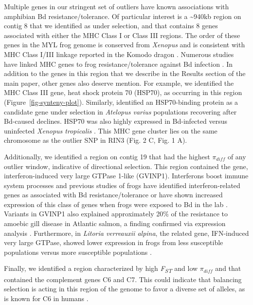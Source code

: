 \documentclass[9pt,twoside,lineno]{pnas-new}
\begin{document}
Multiple genes in our stringent set of outliers have known associations
with amphibian Bd resistance/tolerance. Of particular interest is a
\textasciitilde940kb region on contig 8 that we identified as under
selection, and that contains 8 genes associated with either the MHC
Class I or Class III regions. The order of these genes in the MYL frog
genome is conserved from \emph{Xenopus} \citep{ohta2006} and is
consistent with MHC Class I/III linkage reported in the Komodo dragon
\citep{reed2021}. Numerous studies have linked MHC genes to frog
resistance/tolerance against Bd infection
\citep[e.g.,][]{savage2011, bataille2015}. In addition to the genes in
this region that we describe in the Results section of the main paper,
other genes also deserve mention. For example, we identified the MHC
Class III gene, heat shock protein 70 (HSP70), as occurring in this
region (Figure~\ref{fig-synteny-plot}). Similarly, \citep{byrne2020}
identified an HSP70-binding protein as a candidate gene under selection
in \emph{Atelopus varius} populations recovering after Bd-caused
declines. HSP70 was also highly expressed in Bd-infected versus
uninfected \emph{Xenopus tropicalis} \citep{rosenblum2009}. This MHC
gene cluster lies on the same chromosome as the outlier SNP in RIN3
(Fig. 2 C, Fig. 1
A).

Additionally, we identified a region on contig 19 that had the highest
\(\pi_{diff}\) of any outlier window, indicative of directional
selection. This region contained the gene, interferon-induced very large
GTPase 1-like (GVINP1). Interferons boost immune system processes and
previous studies of frogs have identified interferon-related genes as
associated with Bd resistance/tolerance \citep{byrne2020} or have shown
increased expression of this class of genes when frogs were exposed to
Bd in the lab \citep{rosenblum2009, ellison2014}. Variants in GVINP1
also explained approximately 20\% of the resistance to amoebic gill
disease in Atlantic salmon, a finding confirmed via expression analysis
\citep{robledo2018, robledo2020}. Furthermore, in \emph{Litoria
verreauxii alpina}, the related gene, IFN-induced very large GTPase,
showed lower expression in frogs from less susceptible populations
versus more susceptible populations \citep{grogan2018}.

Finally, we identified a region characterized by high
\emph{F\textsubscript{ST}} and low \(\pi_{diff}\) and that contained the
complement genes C6 and C7. This could indicate that balancing selection
is acting in this region of the genome to favor a diverse set of
alleles, as is known for C6 in humans \citep{soejima2005}.
\end{document}
